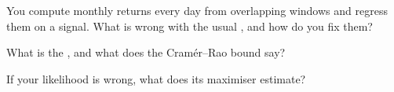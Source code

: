 \begin{interviewq}\label{iq:qm:estimation:4}
You compute monthly returns every day from overlapping windows and regress them on a signal. What is wrong with the usual
, and how do you fix them?
\end{interviewq}

\begin{interviewq}\label{iq:qm:estimation:5}
What is the , and what does the Cramér--Rao bound say?
\end{interviewq}

\begin{interviewq}\label{iq:qm:estimation:6}
If your likelihood is wrong, what does its maximiser estimate?
\end{interviewq}
